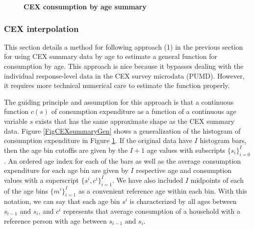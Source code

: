 \documentclass[letterpaper,12pt]{article}
\theoremstyle{definition}
\begin{document}
      \begin{figure}[htb]\centering\captionsetup{width=4.0in}
        \caption{\textbf{CEX consumption by age summary}}\label{FigCEXsummary}
      \end{figure}


    \subsubsection{CEX interpolation}\label{SecDataConsInterp}

      This section details a method for following approach (1) in the previous section for using CEX summary data by age to estimate a general function for consumption by age. This approach is nice because it bypasses dealing with the individual response-level data in the CEX survey microdata (PUMD). However, it requires more technical numerical care to estimate the function properly.

      The guiding principle and assumption for this approach is that a continuous function $c(s)$ of consumption expenditure as a function of a continuous age variable $s$ exists that has the same approximate shape as the CEX summary data. Figure \ref{FigCEXsummaryGen} shows a generalization of the histogram of consumption expenditure in Figure \ref{FigCEXsummary}. If the original data have $I$ histogram bars, then the age bin cutoffis are given by the $I+1$ age values with subscripts $\{s_i\}_{i=0}^I$. An ordered age index for each of the bars as well as the average consumption expenditure for each age bin are given by $I$ respective age and consumption values with a superscript $\{s^i, c^i\}_{i=1}^I$. We have also included $I$ midpoints of each of the age bins $\{m^i\}_{i=1}^I$ as a convenient reference age within each bin. With this notation, we can say that each age bin $s^i$ is characterized by all ages between $s_{i-1}$ and $s_i$, and $c^i$ represents that average consumption of a household with a reference person with age between $s_{i-1}$ and $s_i$.
\end{document}
